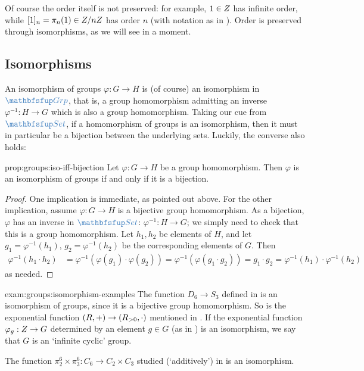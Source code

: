 Of course the order itself is not preserved: for example, $1 \in Z$
has infinite order, while $[1]_n = \pi_n(1) \in Z/nZ$ has order $n$
(with notation as in ). Order is
preserved through isomorphisms, as we will see in a moment.

\subsection{Isomorphisms}
\label{subsec:groups:isomorphisms}
An isomorphism of groups $\varphi : G \to H$ is (of course) an
isomorphism in $\categ{Grp}$, that is, a group homomorphism admitting
an inverse $\varphi^{-1} : H \to G$ which is also a group
homomorphism. Taking our cue from $\categ{Set}$, if a homomorphism of
groups is an isomorphism, then it must in particular be a bijection
between the underlying sets. Luckily, the converse also holds:

\begin{prop}{}{prop:groups:iso-iff-bijection}
  Let $\varphi : G \to H$ be a group homomorphism. Then
    $\varphi$ is an isomorphism of groups if and only if it is a
    bijection.
\end{prop}
\begin{proof}
  One implication is immediate, as pointed out above. For the other
  implication, assume $\varphi : G \to H$ is a bijective group
  homomorphism. As a bijection, $\varphi$ has an inverse in
  $\categ{Set}$: $\varphi^{-1} : H \to G$; we simply need to check
  that this is a group homomorphism. Let $h_1, h_2$ be elements of
  $H$, and let $g_1 = \varphi^{-1}(h_1)$, $g_2 = \varphi^{-1}(h_2)$ be
  the corresponding elements of $G$. Then
  \begin{align*}
    \varphi^{-1}(h_1 \cdot h_2)
    &= \varphi^{-1}(\varphi(g_1) \cdot \varphi(g_2))
      = \varphi^{-1}(\varphi(g_1 \cdot g_2))
      = g_1 \cdot g_2
      = \varphi^{-1}(h_1) \cdot \varphi^{-1}(h_2)
  \end{align*}
  as needed.
\end{proof}
\begin{exam}{}{exam:groups:isomorphism-examples}
  The function $D_6 \to S_3$ defined in
   is an isomorphism of groups,
  since it is a bijective group homomorphism. So is the exponential
  function $(R, +) \to (R_{>0}, \cdot)$ mentioned in
  . If the exponential function
  $\varphi_g : Z \to G$ determined by an element $g \in G$ (as in
  ) is an isomorphism, we say that $G$
  is an `infinite cyclic' group.

  The function $\pi^6_2 \times \pi^6_3 : C_6 \to C_2 \times C_3$
  studied (`additively') in  is an
  isomorphism.
\end{exam}

